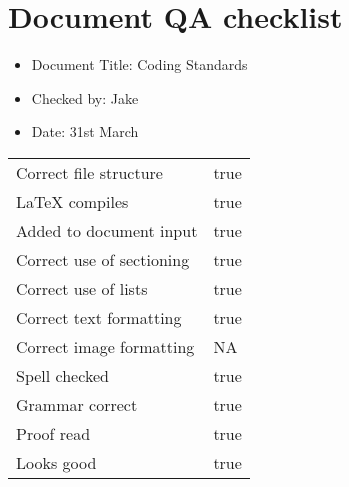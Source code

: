\documentclass[14pt]{article}
\begin{document}
\section*{Document QA checklist}
\Large
\begin{itemize}
\item Document Title: Coding Standards
\item Checked by: Jake
\item Date: 31st March
\end{itemize}
\Large
\begin{tabularx}{\textwidth}{ X | X }
Correct file structure &  true\\
\LaTeX \hspace{4pt} compiles & true\\
Added to document input & true\\
Correct use of sectioning & true\\
Correct use of lists & true\\
Correct text formatting & true\\
Correct image formatting & NA\\
Spell checked & true\\
Grammar correct & true\\
Proof read & true\\
Looks good & true\\
\end{tabularx}
\end{document}
